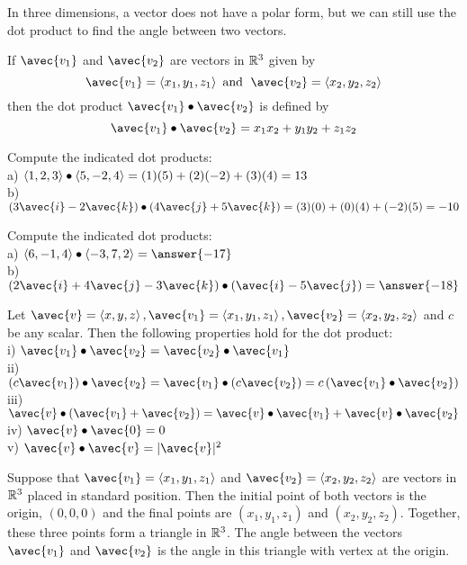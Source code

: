 \documentclass[handout]{ximera}
\begin{document}
In three dimensions, a vector does not have a polar form, but we can still use the dot product to find the angle between two vectors.
\begin{definition}
If $\avec{v_1}$ and $\avec{v_2}$ are vectors in $\mathbb R^3$ given by
\[
\avec{v_1} = \vector{x_1, y_1, z_1} \text{  and   } \;\avec{v_2} = \vector{x_2, y_2, z_2}
\]
then the dot product $\avec{v_1} \dotp \avec{v_2}$ is defined by
\[
\avec{v_1} \dotp \avec{v_2} = x_1x_2 + y_1y_2 + z_1z_2
\]
\end{definition}

\begin{example}
Compute the indicated dot products:\\
a) $\left\langle 1, 2, 3\right\rangle \bullet \left\langle 5, -2, 4\right\rangle = (1)(5)+ (2)(-2) + (3)(4) = 13$\\
b) $\left(3\avec{i} - 2\avec{k}\right) \dotp \left(4\avec{j} + 5\avec{k}\right) = (3)(0) + (0)(4) + (-2)(5) = -10$
\end{example}

\begin{problem}
Compute the indicated dot products:\\
a) $\vector{6, -1, 4} \dotp \vector{-3, 7, 2} = \answer{-17}$\\
b) $\left(2\avec{i} + 4\avec{j} - 3\avec{k}\right) \dotp \left(\avec{i} -5\avec{j}\right) = \answer{-18}$
\end{problem}

\begin{proposition}
Let $\avec{v} = \vector{x, y, z}, \avec{v_1} = \vector{x_1, y_1, z_1}, \avec{v_2} = \vector{x_2, y_2, z_2}$ and $c$ be any scalar. 
Then the following properties hold for the dot product:\\
i) $\avec{v_1} \dotp \avec{v_2} = \avec{v_2} \dotp \avec{v_1}$\\
ii) $\left(c\avec{v_1}\right) \dotp \avec{v_2} = \avec{v_1} \dotp \left(c\avec{v_2}\right) = c\left(\avec{v_1} \dotp \avec{v_2}\right)$\\
iii)  $\avec{v} \dotp \left(\avec{v_1} + \avec{v_2}\right) = \avec{v} \dotp \avec{v_1} + \avec{v} \dotp \avec{v_2}$\\
iv) $\avec{v} \dotp \avec{0} = 0$\\
v) $\avec{v} \dotp \avec{v} = |\avec{v}|^2$
\end{proposition}

Suppose that $\avec{v_1}=\vector{x_1, y_1, z_1}$ and $\avec{v_2}=\vector{x_2, y_2, z_2}$  are vectors in $\mathbb R^3$ placed in standard position.  
Then the initial point of both vectors is the origin, $(0,0,0)$ and the final points are
$(x_1, y_1, z_1)$ and $(x_2, y_2, z_2)$.  Together, these three points form a triangle in $\mathbb R^3$.  
The angle between the vectors $\avec{v_1}$ and $\avec{v_2}$ is the angle in this triangle with vertex at the origin.
\end{document}
